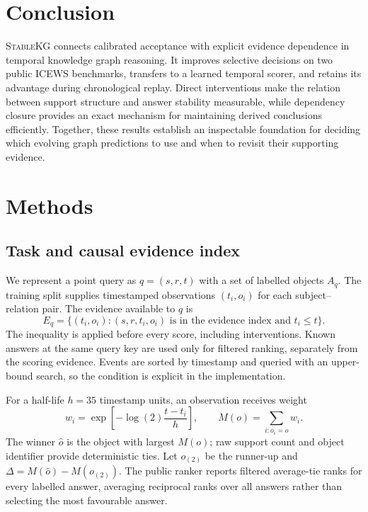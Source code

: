 \documentclass[preprint,12pt]{elsarticle}
\newcommand{\StableKG}{\textsc{StableKG}}
\begin{document}
\section{Conclusion}
\StableKG{} connects calibrated acceptance with explicit evidence dependence in temporal knowledge graph reasoning. It improves selective decisions on two public ICEWS benchmarks, transfers to a learned temporal scorer, and retains its advantage during chronological replay. Direct interventions make the relation between support structure and answer stability measurable, while dependency closure provides an exact mechanism for maintaining derived conclusions efficiently. Together, these results establish an inspectable foundation for deciding which evolving graph predictions to use and when to revisit their supporting evidence.

\section{Methods}

\subsection{Task and causal evidence index}
We represent a point query as $q=(s,r,t)$ with a set of labelled objects $A_q$. The training split supplies timestamped observations $(t_i,o_i)$ for each subject--relation pair. The evidence available to $q$ is
\begin{equation}
 E_q=\{(t_i,o_i): (s,r,t_i,o_i)\text{ is in the evidence index and }t_i\leq t\}.
\end{equation}
The inequality is applied before every score, including interventions. Known answers at the same query key are used only for filtered ranking, separately from the scoring evidence. Events are sorted by timestamp and queried with an upper-bound search, so the condition is explicit in the implementation.

For a half-life $h=35$ timestamp units, an observation receives weight
\begin{equation}
 w_i=\exp\left[-\log(2)\frac{t-t_i}{h}\right], \qquad M(o)=\sum_{i:o_i=o}w_i.
\end{equation}
The winner $\hat{o}$ is the object with largest $M(o)$; raw support count and object identifier provide deterministic ties. Let $o_{(2)}$ be the runner-up and $\Delta=M(\hat{o})-M(o_{(2)})$. The public ranker reports filtered average-tie ranks for every labelled answer, averaging reciprocal ranks over all answers rather than selecting the most favourable answer.
\end{document}
